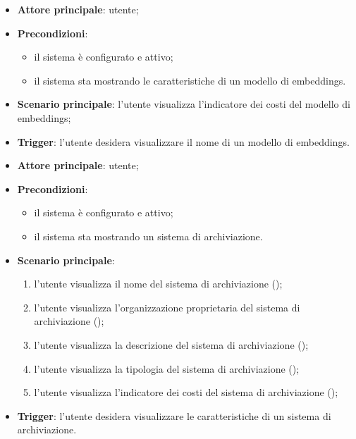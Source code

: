 \documentclass[10pt, a4paper]{article}
\begin{document}
    \begin{itemize}
        \item \textbf{Attore principale}: utente;
        \item \textbf{Precondizioni}:
            \begin{itemize}
                \item il sistema è configurato e attivo;
                \item il sistema sta mostrando le caratteristiche di un modello di embeddings.
            \end{itemize}
        \item \textbf{Scenario principale}: l'utente visualizza l'indicatore dei costi del modello di embeddings;
        \item \textbf{Trigger}: l’utente desidera visualizzare il nome di un modello di embeddings.
    \end{itemize}


    \begin{itemize}
        \item \textbf{Attore principale}: utente;
        \item \textbf{Precondizioni}:
            \begin{itemize}
                \item il sistema è configurato e attivo;
                \item il sistema sta mostrando un sistema di archiviazione.
            \end{itemize}
        \item \textbf{Scenario principale}:
            \begin{enumerate}
                \item l'utente visualizza il nome del sistema di archiviazione ();
                \item l'utente visualizza l'organizzazione proprietaria del sistema di archiviazione ();
                \item l'utente visualizza la descrizione del sistema di archiviazione ();
                \item l'utente visualizza la tipologia del sistema di archiviazione ();
                \item l'utente visualizza l'indicatore dei costi del sistema di archiviazione ();
            \end{enumerate}
        \item \textbf{Trigger}: l’utente desidera visualizzare le caratteristiche di un sistema di archiviazione.
    \end{itemize}
\end{document}
